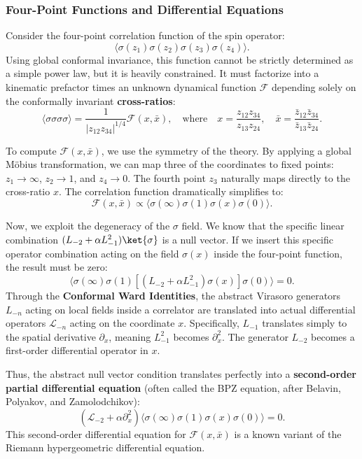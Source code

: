 \subsubsection{Four-Point Functions and Differential Equations}

Consider the four-point correlation function of the spin operator:
\[
    \langle \sigma(z_1) \sigma(z_2) \sigma(z_3) \sigma(z_4) \rangle.
\]
Using global conformal invariance, this function cannot be strictly determined as a simple power law, but it is heavily constrained. It must factorize into a kinematic prefactor times an unknown dynamical function \(\mathcal{F}\) depending solely on the conformally invariant \textbf{cross-ratios}:
\[
    \langle \sigma \sigma \sigma \sigma \rangle = \frac{1}{|z_{12} z_{34}|^{1/4}} \mathcal{F}(x, \bar{x}), \quad \text{where} \quad x = \frac{z_{12} z_{34}}{z_{13} z_{24}}, \quad \bar{x} = \frac{\bar{z}_{12} \bar{z}_{34}}{\bar{z}_{13} \bar{z}_{24}}.
\]

To compute \(\mathcal{F}(x, \bar{x})\), we use the symmetry of the theory. By applying a global Möbius transformation, we can map three of the coordinates to fixed points: \(z_1 \to \infty\), \(z_2 \to 1\), and \(z_4 \to 0\). The fourth point \(z_3\) naturally maps directly to the cross-ratio \(x\). The correlation function dramatically simplifies to:
\[
    \mathcal{F}(x, \bar{x}) \propto \langle \sigma(\infty) \sigma(1) \sigma(x) \sigma(0) \rangle.
\]

Now, we exploit the degeneracy of the \(\sigma\) field. We know that the specific linear combination \((L_{-2} + \alpha L_{-1}^2) \ket{\sigma}\) is a null vector. If we insert this specific operator combination acting on the field \(\sigma(x)\) inside the four-point function, the result must be zero:
\[
    \langle \sigma(\infty) \sigma(1) \left[ (L_{-2} + \alpha L_{-1}^2) \sigma(x) \right] \sigma(0) \rangle = 0.
\]
Through the \textbf{Conformal Ward Identities}, the abstract Virasoro generators \(L_{-n}\) acting on local fields inside a correlator are translated into actual differential operators \(\mathcal{L}_{-n}\) acting on the coordinate \(x\). Specifically, \(L_{-1}\) translates simply to the spatial derivative \(\partial_x\), meaning \(L_{-1}^2\) becomes \(\partial_x^2\). The generator \(L_{-2}\) becomes a first-order differential operator in \(x\).

Thus, the abstract null vector condition translates perfectly into a \textbf{second-order partial differential equation} (often called the BPZ equation, after Belavin, Polyakov, and Zamolodchikov):
\[
    \left( \mathcal{L}_{-2} + \alpha \partial_x^2 \right) \langle \sigma(\infty) \sigma(1) \sigma(x) \sigma(0) \rangle = 0.
\]
This second-order differential equation for \(\mathcal{F}(x, \bar{x})\) is a known variant of the Riemann hypergeometric differential equation.

